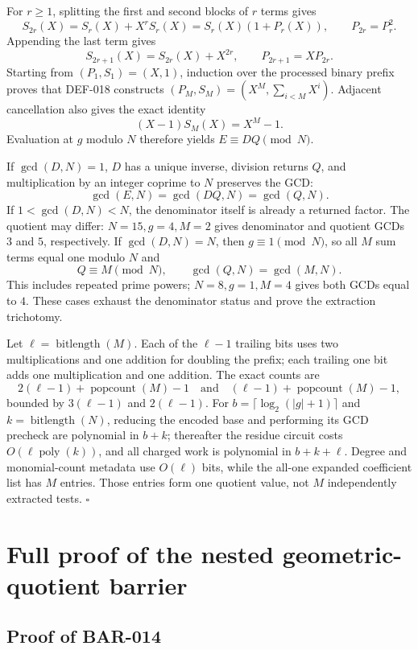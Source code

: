 \documentclass[11pt]{article}
\newcommand{\poly}{\operatorname{poly}}
\begin{document}
For \(r\ge1\), splitting the first and second blocks of \(r\) terms gives
\[
S_{2r}(X)=S_r(X)+X^rS_r(X)=S_r(X)(1+P_r(X)),
\qquad P_{2r}=P_r^2.
\]
Appending the last term gives
\[
S_{2r+1}(X)=S_{2r}(X)+X^{2r},
\qquad P_{2r+1}=XP_{2r}.
\]
Starting from \((P_1,S_1)=(X,1)\), induction over the processed binary
prefix proves that DEF-018 constructs
\((P_M,S_M)=(X^M,\sum_{i<M}X^i)\). Adjacent cancellation also gives the
exact identity
\[
(X-1)S_M(X)=X^M-1.
\]
Evaluation at \(g\) modulo \(N\) therefore yields \(E\equiv DQ\pmod N\).

If \(\gcd(D,N)=1\), \(D\) has a unique inverse, division returns \(Q\), and
multiplication by an integer coprime to \(N\) preserves the GCD:
\[
\gcd(E,N)=\gcd(DQ,N)=\gcd(Q,N).
\]
If \(1<\gcd(D,N)<N\), the denominator itself is already a returned factor.
The quotient may differ: \(N=15,g=4,M=2\) gives denominator and quotient
GCDs \(3\) and \(5\), respectively. If \(\gcd(D,N)=N\), then
\(g\equiv1\pmod N\), so all \(M\) sum terms equal one modulo \(N\) and
\[
Q\equiv M\pmod N,\qquad \gcd(Q,N)=\gcd(M,N).
\]
This includes repeated prime powers; \(N=8,g=1,M=4\) gives both GCDs equal
to \(4\). These cases exhaust the denominator status and prove the
extraction trichotomy.

Let \(\ell=\operatorname{bitlength}(M)\). Each of the \(\ell-1\) trailing
bits uses two multiplications and one addition for doubling the prefix; each
trailing one bit adds one multiplication and one addition. The exact counts
are
\[
2(\ell-1)+\operatorname{popcount}(M)-1
\quad\text{and}\quad
(\ell-1)+\operatorname{popcount}(M)-1,
\]
bounded by \(3(\ell-1)\) and \(2(\ell-1)\). For
\(b=\lceil\log_2(|g|+1)\rceil\) and
\(k=\operatorname{bitlength}(N)\), reducing the encoded base and performing its GCD
precheck are polynomial in \(b+k\); thereafter the residue
circuit costs \(O(\ell\poly(k))\), and all charged work is polynomial in
\(b+k+\ell\). Degree and monomial-count metadata use \(O(\ell)\) bits, while
the all-one expanded coefficient list has \(M\) entries. Those entries form
one quotient value, not \(M\) independently extracted tests. \(\square\)

\section{Full proof of the nested geometric-quotient barrier}

\subsection{Proof of BAR-014}\label{proof:BAR-014}
\end{document}
